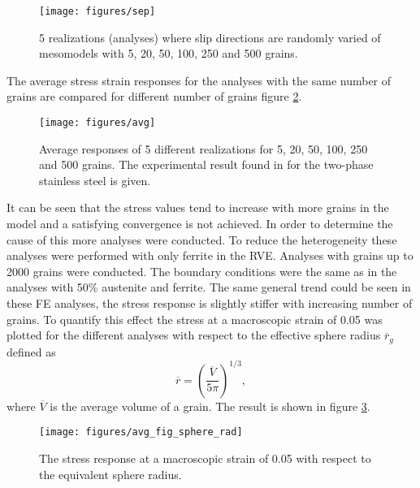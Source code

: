 \documentclass[crystal_plast.tex]{subfiles}
\begin{document}
 \begin{figure}[ht]
\centering
\texttt{[image: figures/sep]}
\caption{5 realizations (analyses) where slip directions are randomly varied of mesomodels with 5, 20, 50, 100, 250 and 500 grains.}
\label{fig:sep}
\end{figure}

The average stress strain responses for the analyses with the same number of grains are compared for different number of grains figure \ref{fig:avg}.

\begin{figure}[htpb!]
\centering
\texttt{[image: figures/avg]}
\caption{Average responses of 5 different realizations for 5, 20, 50, 100, 250 and 500 grains. The experimental result found in \cite{lillekh} for the two-phase stainless steel is given.}
\label{fig:avg}
\end{figure}

It can be seen that the stress values tend to increase with more grains in the model and a satisfying convergence is not achieved. In order to determine the cause of this more analyses were conducted. To reduce the heterogeneity these analyses were performed with only ferrite in the RVE. Analyses with grains up to 2000 grains were conducted. The boundary conditions were the same as in the analyses with 50\% austenite and ferrite. The same general trend could be seen in these FE analyses, the stress response is slightly stiffer with increasing number of grains. To quantify this effect the stress at a macroscopic strain of 0.05 was plotted for the different analyses with respect to the effective sphere radius $\overline{r}_g$ defined as
\begin{equation}
 \overline{r} = \left( \frac{ \overline{V}}{5 \pi} \right)^{1/3},
\end{equation}
where $\overline{V}$ is the average volume of a grain. The result is shown in figure \ref{fig:avg_sphere_rad}.


\begin{figure}[htpb!]
\centering
\texttt{[image: figures/avg\_fig\_sphere\_rad]}
\caption{The stress response at a macroscopic strain of 0.05 with respect to the equivalent sphere radius.}
\label{fig:avg_sphere_rad}
\end{figure}
\end{document}
